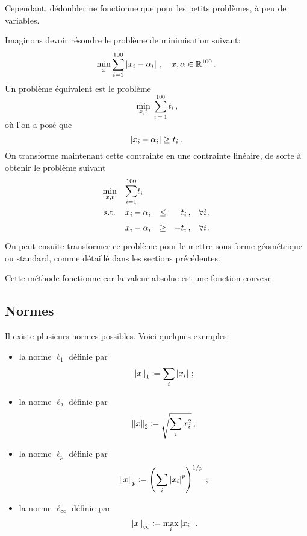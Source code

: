 	Cependant, dédoubler ne fonctionne que pour les petits problèmes,
	à peu de variables.

	Imaginons devoir résoudre le problème de minimisation suivant:
	\[
	\min_x \sum_{i=1}^{100} \left\lvert x_i - \alpha_i\right\lvert\,, \quad x,\alpha \in \mathbb{R}^{100}\,.
	\]
	Un problème équivalent est le problème
	\[
	\min_{x,t} \sum_{i=1}^{100} t_i\,,
	\]
	où l'on a posé que
	\[
	\left\lvert x_i - \alpha_i\right\lvert \ge t_i\,.
	\]
	On transforme maintenant cette contrainte en une contrainte linéaire,
	de sorte à obtenir le problème suivant
	\[
	\renewcommand{\arraystretch}{1.5}
	\begin{array}{c@{\quad} l c r@{\quad} l}
		\min\limits_{x,t} & {\displaystyle \sum_{i=1}^{100}} t_i &&&\\
		\textnormal{s.t.} & x_i - \alpha_i & \le & t_i\,, & \forall i\,,\\
		& x_i - \alpha_i & \ge & -t_i\,, & \forall i\,.\\
	\end{array}
	\]
	On peut ensuite transformer ce problème
	pour le mettre sous forme géométrique ou standard,
	comme détaillé dans les sections précédentes.

	Cette méthode fonctionne car la valeur absolue est une fonction convexe.

\subsection{Normes}

	Il existe plusieurs normes possibles.
	Voici quelques exemples:

	\begin{itemize}
		\item la norme $\ell_1$ définie par
		\[
		\left\lVert x\right\rVert_1 \coloneqq \sum_i \left\lvert x_i\right\lvert\,;
		\]
		\item la norme $\ell_2$ définie par
		\[
		\left\lVert x\right\rVert_2 \coloneqq \sqrt{\sum_i x_i^2}\,;
		\]
		\item la norme $\ell_p$ définie par
		\[
		\left\lVert x\right\rVert_p \coloneqq \left(\sum_i \left\lvert x_i\right\lvert^p\right)^{1/p}\,;
		\]
		\item la norme $\ell_\infty$ définie par
		\[
		\left\lVert x\right\rVert_\infty \coloneqq \max_i \left\lvert x_i\right\lvert\,.
		\]
	\end{itemize}

